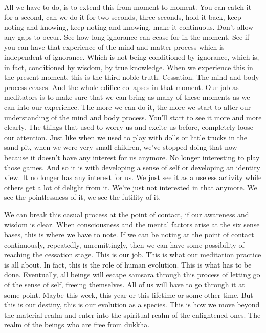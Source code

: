 \documentclass[letterpaper,10pt,english]{sphinxmanual}
\begin{document}
\sphinxAtStartPar
All we have to do, is to extend this from moment to moment. You can
catch it for a second, can we do it for two seconds, three seconds, hold it
back, keep noting and knowing, keep noting and knowing, make it continuous. Don’t allow any gaps to occur. See how long ignorance can cease for
in the moment. See if you can have that experience of the mind and matter
process which is independent of ignorance. Which is not being conditioned
by ignorance, which is, in fact, conditioned by wisdom, by true knowledge.
When we experience this in the present moment, this is the third noble
  truth. Cessation. The mind and body process ceases. And the whole edifice
collapses in that moment. Our job as meditators is to make sure that we can
bring as many of these moments as we can into our experience. The more we
can do it, the more we start to alter our understanding of the mind and body
process. You’ll start to see it more and more clearly. The things that used to
worry us and excite us before, completely loose our attention. Just like when
we used to play with dolls or little trucks in the sand pit, when we were very
small children, we’ve stopped doing that now because it doesn’t have any
interest for us anymore. No longer interesting to play those games. And so it
is with developing a sense of self or developing an identity view. It no longer
has any interest for us. We just see it as a useless activity while others get a
lot of delight from it. We’re just not interested in that anymore. We see the
pointlessness of it, we see the futility of it.

\sphinxAtStartPar
We can break this casual process at the point of contact, if our awareness and wisdom is clear. When consciousness and the mental factors arise
at  the  six  sense  bases,  this  is  where  we  have  to  note.  If  we  can  be  noting
at the point of contact continuously, repeatedly, unremittingly, then we can
have some possibility of reaching the cessation stage. This is our job. This
is what our meditation practice is all about. In fact, this is the role of human
evolution. This  is  what  has  to  be  done.  Eventually,  all  beings  will  escape
samsara through this process of letting go of the sense of self, freeing themselves. All of us will have to go through it at some point. Maybe this week,
this year or this lifetime or some other time. But this is our destiny, this is
our evolution as a species. This is how we move beyond the material realm
and enter into the spiritual realm of the enlightened ones. The realm of the
beings who are free from dukkha.
\end{document}
